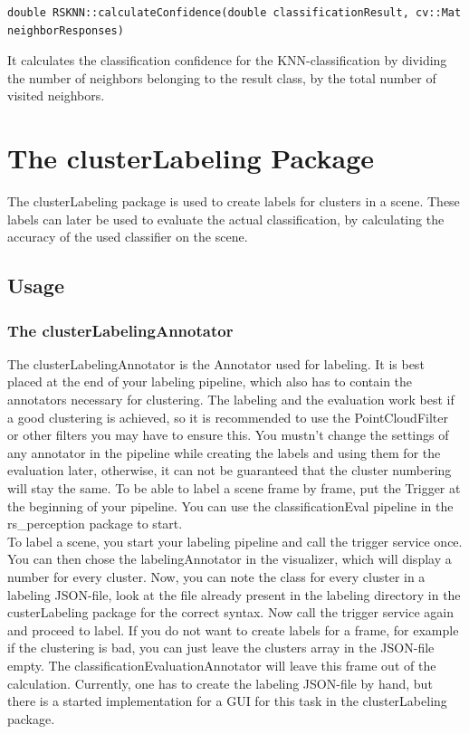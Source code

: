 \documentclass[main.tex]{subfiles}
\begin{document}
\begin{lstlisting}
double RSKNN::calculateConfidence(double classificationResult, cv::Mat neighborResponses)
\end{lstlisting}

It calculates the classification confidence for the KNN-classification by dividing the number of neighbors belonging to the result class, by the total number of visited neighbors. 

\section{The clusterLabeling Package}
The clusterLabeling package is used to create labels for clusters in a scene. These labels can later be used to evaluate the actual classification, by calculating the accuracy of the used classifier on the scene.

\subsection{Usage}

\subsubsection{The clusterLabelingAnnotator}
The clusterLabelingAnnotator is the Annotator used for labeling. It is best placed at the end of your labeling pipeline, which also has to contain the annotators necessary for clustering. The labeling and the evaluation work best if a good clustering is achieved, so it is recommended to use the PointCloudFilter or other filters you may have to ensure this. You mustn't change the settings of any annotator in the pipeline while creating the labels and using them for the evaluation later, otherwise, it can not be guaranteed that the cluster numbering will stay the same. To be able to label a scene frame by frame, put the Trigger at the beginning of your pipeline. You can use the classificationEval pipeline in the rs\_perception package to start.\\

To label a scene, you start your labeling pipeline and call the trigger service once. You can then chose the labelingAnnotator in the visualizer, which will display a number for every cluster. Now, you can note the class for every cluster in a labeling JSON-file, look at the file already present in the labeling directory in the custerLabeling package for the correct syntax. Now call the trigger service again and proceed to label. If you do not want to create labels for a frame, for example if the clustering is bad, you can just leave the clusters array in the JSON-file empty. The classificationEvaluationAnnotator will leave this frame out of the calculation. Currently, one has to create the labeling JSON-file by hand, but there is a started implementation for a GUI for this task in the clusterLabeling package.
\end{document}
